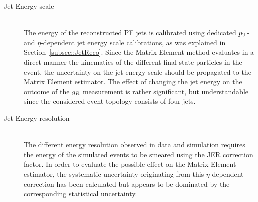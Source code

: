 \begin{myindentpar}
\begin{description}
    \item[Jet Energy scale] \hfill \\
    The energy of the reconstructed PF jets is calibrated using dedicated $p_{\rm T}$- and $\eta$-dependent jet energy scale calibrations, as was explained in Section~\ref{subsec::JetReco}.
    Since the Matrix Element method evaluates in a direct manner the kinematics of the different final state particles in the event, the uncertainty on the jet energy scale should be propagated to the Matrix Element estimator.
    The effect of changing the jet energy on the outcome of the $g_{R}$ measurement is rather significant, but understandable since the considered event topology consists of four jets.
    
    
    \item[Jet Energy resolution] \hfill \\
    The different energy resolution observed in data and simulation requires the energy of the simulated events to be smeared using the JER correction factor.
    In order to evaluate the possible effect on the Matrix Element estimator, the systematic uncertainty originating from this $\eta$-dependent correction has been calculated but appears to be dominated by the corresponding statistical uncertainty.     
    

\end{description}
\end{myindentpar}
